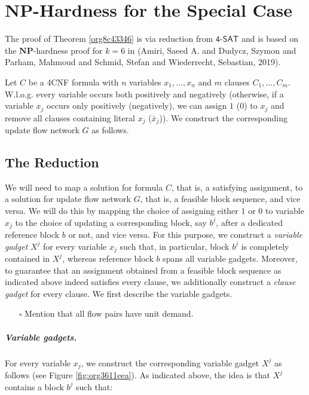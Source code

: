 \documentclass[fontsize=11pt,paper=a4]{book}
\begin{document}
\chapter{\(\textbf{NP}\)-Hardness for the Special Case}
\label{sec:org9af9543}

The proof of Theorem \ref{org8c43346} is via reduction from \(\textsf{4-SAT}\) and is based on the \(\textbf{NP}\)-hardness proof for \(k=6\) in (Amiri, Saeed A. and Dudycz, Szymon and Parham, Mahmoud and Schmid, Stefan and Wiederrecht, Sebastian, 2019).

Let \(C\) be a 4CNF formula with \(n\) variables \(x_1,\dots,x_n\) and \(m\) clauses \(C_1,\dots,C_m\).
W.l.o.g. every variable occurs both positively and negatively (otherwise, if a variable \(x_j\) occurs only positively (negatively), we can assign \(1\) (\(0\)) to \(x_j\) and remove all clauses containing literal \(x_j\) (\(\bar{x}_j\))).
We construct the corresponding update flow network \(G\) as follows.

\section{The Reduction}
\label{sec:orgf1866d6}

We will need to map a solution for formula \(C\), that is, a satisfying assignment, to a solution for update flow network \(G\), that is, a feasible block sequence, and vice versa.
We will do this by mapping the choice of assigning either \(1\) or \(0\) to variable \(x_j\) to the choice of updating a corresponding block, say \(b^j\), after a dedicated reference block \(b\) or not, and vice versa.
For this purpose, we construct a \emph{variable gadget} \(X^j\) for every variable \(x_j\) such that, in particular, block \(b^j\) is completely contained in \(X^j\), whereas reference block \(b\) spans all variable gadgets.
Moreover, to guarantee that an assignment obtained from a feasible block sequence as indicated above indeed satisfies every clause, we additionally construct a \emph{clause gadget} for every clause.
We first describe the variable gadgets.

\begin{itemize}
\item[{$\square$}] Mention that all flow pairs have unit demand.
\end{itemize}

\paragraph{Variable gadgets.}
For every variable \(x_j\), we construct the corresponding variable gadget \(X^j\) as follows (see Figure \ref{fig:org3611eea}).
As indicated above, the idea is that \(X^j\) contains a block \(b^j\) such that:
\end{document}
